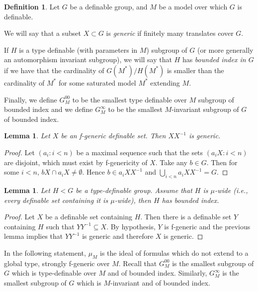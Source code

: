 \documentclass[12pt]{article}
\newtheorem{lemme}[thm]{Lemma}
\theoremstyle{definition}
\newtheorem{defi}[thm]{Definition}
\theoremstyle{mystyle}
\theoremstyle{remark}
\begin{document}
\begin{defi}\label{defG00}
  Let $G$ be a definable group, and $M$ be a model over which $G$ is definable.

  We will say that a subset $X\subset G$ is \emph{generic} if finitely many translates cover $G$.



  If $H$ is a type definable (with parameters in $M$) subgroup of $G$ (or more generally an automorphism invariant subgroup),
  we will say that $H$ has \emph{bounded index in $G$} if
  we have that the cardinality of $G(M^*)/H(M^*)$ is smaller than the cardinality of $M^*$ for some saturated model $M^*$ extending
  $M$.



  Finally, we define $G^{00}_M$ to be the smallest type definable over $M$ subgroup of bounded index and  we define
  $G^{\infty}_M$ to be the smallest $M$-invariant subgroup of $G$ of bounded index.
\end{defi}




\begin{lemme}
Let $X$ be an f-generic definable set. Then $XX^{-1}$ is generic.
\end{lemme}
\begin{proof}
Let $(a_i:i<n)$ be a maximal sequence such that the sets $(a_i X:i<n)$ are disjoint, which must exist by f-genericity of $X$. Take any $b\in G$. Then for some $i<n$, $bX \cap a_i X \neq \emptyset$. Hence $b\in a_i XX^{-1}$ and $\bigcup_{i<n} a_i XX^{-1} = G$.
\end{proof}

\begin{lemme}\label{lem_bddindex}
Let $H<G$ be a type-definable group. Assume that $H$ is $\mu$-wide ({\it i.e.}, every definable set containing it is $\mu$-wide), then $H$ has bounded index.
\end{lemme}
\begin{proof}
Let $X$ be a definable set containing $H$. Then there is a definable set $Y$ containing $H$ such that $YY^{-1} \subseteq X$. By hypothesis, $Y$ is f-generic and the previous lemma implies that $YY^{-1}$ is generic and therefore $X$ is generic.
\end{proof}

In the following statement, $\mu_M$ is the ideal of formulas which do not extend to a global type, strongly f-generic over $M$. Recall that $G^{00}_M$ is the smallest subgroup of $G$ which is type-definable over $M$ and of bounded index. Similarly, $G^{\infty}_M$ is the smallest subgroup of $G$ which is $M$-invariant and of bounded index.
\end{document}
